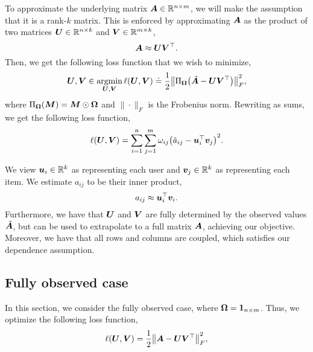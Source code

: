 To approximate the underlying matrix $\bm{A} \in \mathbb{R}^{n \times m}$, we will make the assumption
that it is a rank-$k$ matrix. This is enforced by approximating $\bm{A}$ as the product of two
matrices $\bm{U} \in \mathbb{R}^{n \times k}$ and $\bm{V} \in \mathbb{R}^{m \times k}$, \[
    \bm{A} \approx \bm{U} \bm{V}^\top.
\]
Then, we get the following loss function that we wish to minimize, \[
    \mat{U}, \mat{V} \in \argmin_{\mat{U}, \mat{V}} \ell(\mat{U}, \mat{V}) \doteq \frac{1}{2} \lft\| \Pi_{\mat{\Omega}} \lft( \tilde{\mat{A}} - \mat{U}\transpose{\mat{V}} \rgt) \rgt\|_F^2,
\]
where $\Pi_{\bm{\Omega}}(\bm{M}) = \bm{M} \odot \bm{\Omega}$ and $\| \cdot \|_F$ is the
Frobenius norm. Rewriting as sums, we get the following loss function, \[
    \ell(\mat{U}, \mat{V}) = \sum_{i=1}^{n} \sum_{j=1}^{m} \omega_{ij} \lft( \tilde{a}_{ij} - \transpose{\vec{u}_i} \vec{v}_j \rgt)^2.
\]

\begin{important}
    We view $\bm{u}_i \in \mathbb{R}^k$ as representing each user and $\bm{v}_j \in \mathbb{R}^k$ as
    representing each item. We estimate $a_{ij}$ to be their inner product, \[
        a_{ij} \approx \bm{u}_i^\top \bm{v}_i.
    \]
    Furthermore, we have that $\bm{U}$ and $\bm{V}$ are fully determined by the observed values
    $\tilde{\bm{A}}$, but can be used to extrapolate to a full matrix $\bm{A}$, achieving our
    objective. Moreover, we have that all rows and columns are coupled, which satisfies our dependence
    assumption.
\end{important}

\subsection{Fully observed case}

In this section, we consider the fully observed case, where $\bm{\Omega} = \bm{1}_{n \times m}$.
Thus, we optimize \wrt the following loss function, \[
    \ell(\mat{U}, \mat{V}) = \frac{1}{2} \lft\| \mat{A} - \mat{U}\transpose{\mat{V}} \rgt\|_F^2,
\]

